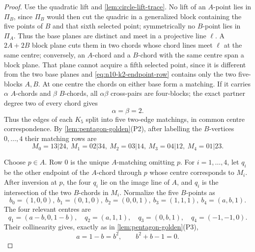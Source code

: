 \begin{proof}
Use the quadratic lift and \cref{lem:circle-lift-trace}.  No lift of an
\(A\)-point lies in \(\Pi_B\), since \(\Pi_B\) would then cut the quadric
in a generalized block containing the five points of \(B\) and that sixth
selected point; symmetrically no \(B\)-point lies in \(\Pi_A\).
Thus the base planes are distinct and meet in a projective line \(\ell\).
A $2A+2B$ block plane
cuts them in two chords whose chord lines meet $\ell$ at the same centre;
conversely, an $A$-chord and a $B$-chord with the same centre span a block
plane.  That plane cannot acquire a fifth selected point, since it is
different from the two base planes and \eqref{eq:n10-k2-endpoint-row}
contains only the two five-blocks $A,B$.  At one centre the chords on either
base form a matching.  If it carries $\alpha$ $A$-chords and $\beta$
$B$-chords, all $\alpha\beta$ cross-pairs are four-blocks; the exact partner
degree two of every chord gives
\begin{equation}\label{eq:n10-k2-centre-degree}
 \alpha=\beta=2.
\end{equation}
Thus the edges of each $K_5$ split into five two-edge matchings, in common
centre correspondence.  By \cref{lem:pentagon-golden}(P2), after labelling
the $B$-vertices $0,\ldots,4$ their matching rows are
\begin{equation}\label{eq:n10-k2-near-factor}
 M_0=13|24,\ M_1=02|34,\ M_2=03|14,\
 M_3=04|12,\ M_4=01|23.
\end{equation}

Choose $p\in A$.  Row $0$ is the unique $A$-matching omitting $p$.  For
$i=1,\ldots,4$, let $q_i$ be the other endpoint of the $A$-chord through
$p$ whose centre corresponds to $M_i$.  After inversion at $p$, the four
$q_i$ lie on the image line of $A$, and $q_i$ is the intersection of the
two $B$-chords in $M_i$.  Normalize the five $B$-points as
\begin{equation}\label{eq:n10-k2-conic-frame}
 b_0=(1,0,0),\ b_1=(0,1,0),\ b_2=(0,0,1),\
 b_3=(1,1,1),\ b_4=(a,b,1).
\end{equation}
The four relevant centres are
\begin{equation}\label{eq:n10-k2-centres}
 q_1=(a-b,0,1-b),\quad q_2=(a,1,1),\quad
 q_3=(0,b,1),\quad q_4=(-1,-1,0).
\end{equation}
Their collinearity gives, exactly as in
\cref{lem:pentagon-golden}(P3),
\begin{equation}\label{eq:n10-k2-golden-wall}
 a=1-b=b^2,\qquad b^2+b-1=0.
\end{equation}


\end{proof}
